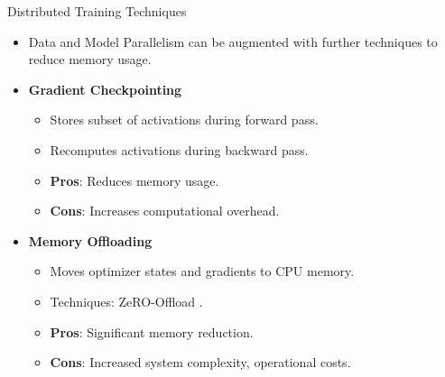 \documentclass{beamer}
\begin{document}
\begin{frame}{Distributed Training Techniques}
    \begin{itemize}
        \item Data and Model Parallelism can be augmented with further techniques to reduce memory usage.
        \item \textbf{Gradient Checkpointing} \citep{chenTrainingDeepNets2016}
            \begin{itemize}
                \item Stores subset of activations during forward pass.
                \item Recomputes activations during backward pass.
                \item \textbf{Pros}: Reduces memory usage.
                \item \textbf{Cons}: Increases computational overhead.
            \end{itemize}
        \item \textbf{Memory Offloading}
            \begin{itemize}
                \item Moves optimizer states and gradients to CPU memory.
                \item Techniques: ZeRO-Offload \citep{rajbhandariZeROMemoryOptimizations2020}.
                \item \textbf{Pros}: Significant memory reduction.
                \item \textbf{Cons}: Increased system complexity, operational costs.
            \end{itemize}
    \end{itemize}
\end{frame}
\end{document}
